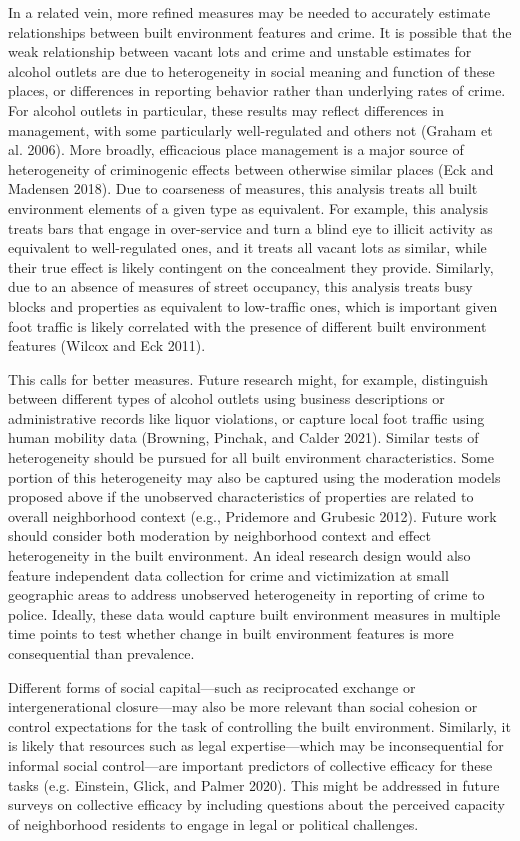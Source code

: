 \documentclass [11pt, proquest] {uwthesis}[2015/03/03]
\begin{document}
In a related vein, more refined measures may be needed to accurately estimate relationships between built environment features and crime. It is possible that the weak relationship between vacant lots and crime and unstable estimates for alcohol outlets are due to heterogeneity in social meaning and function of these places, or differences in reporting behavior rather than underlying rates of crime. For alcohol outlets in particular, these results may reflect differences in management, with some particularly well-regulated and others not (Graham et al. 2006). More broadly, efficacious place management is a major source of heterogeneity of criminogenic effects between otherwise similar places (Eck and Madensen 2018). Due to coarseness of measures, this analysis treats all built environment elements of a given type as equivalent. For example, this analysis treats bars that engage in over-service and turn a blind eye to illicit activity as equivalent to well-regulated ones, and it treats all vacant lots as similar, while their true effect is likely contingent on the concealment they provide. Similarly, due to an absence of measures of street occupancy, this analysis treats busy blocks and properties as equivalent to low-traffic ones, which is important given foot traffic is likely correlated with the presence of different built environment features (Wilcox and Eck 2011).

This calls for better measures. Future research might, for example, distinguish between different types of alcohol outlets using business descriptions or administrative records like liquor violations, or capture local foot traffic using human mobility data (Browning, Pinchak, and Calder 2021). Similar tests of heterogeneity should be pursued for all built environment characteristics. Some portion of this heterogeneity may also be captured using the moderation models proposed above if the unobserved characteristics of properties are related to overall neighborhood context (e.g., Pridemore and Grubesic 2012). Future work should consider both moderation by neighborhood context and effect heterogeneity in the built environment. An ideal research design would also feature independent data collection for crime and victimization at small geographic areas to address unobserved heterogeneity in reporting of crime to police. Ideally, these data would capture built environment measures in multiple time points to test whether change in built environment features is more consequential than prevalence.

Different forms of social capital---such as reciprocated exchange or intergenerational closure---may also be more relevant than social cohesion or control expectations for the task of controlling the built environment. Similarly, it is likely that resources such as legal expertise---which may be inconsequential for informal social control---are important predictors of collective efficacy for these tasks (e.g. Einstein, Glick, and Palmer 2020). This might be addressed in future surveys on collective efficacy by including questions about the perceived capacity of neighborhood residents to engage in legal or political challenges.
\end{document}
